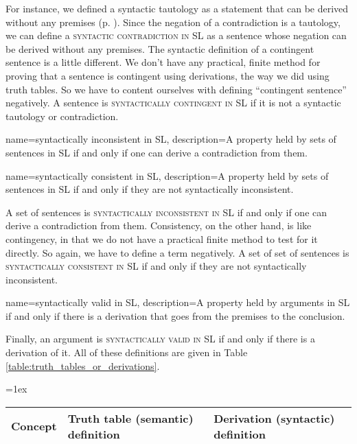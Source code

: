 {For instance, we defined a syntactic tautology as a statement that can be derived without any premises (p. \pageref{def:syntactic_tautology_in_sl}). Since the negation of a contradiction is a tautology, we can define a \textsc{\gls{syntactic contradiction in SL}} \label{def:syntactic_contradiction_in_sl} as a sentence whose negation can be derived without any premises. The syntactic definition of a contingent sentence is a little different. We don't have any practical, finite method for proving that a sentence is contingent using derivations, the way we did using truth tables. So we have to content ourselves with defining ``contingent sentence'' negatively. A sentence is \textsc{\gls{syntactically contingent in SL}} \label{def:syntactically_contingent_in_sl} if it is not a syntactic tautology or contradiction. 
 
{
name=syntactically inconsistent in SL,
description={A property held by sets of sentences in SL if and only if one can derive a contradiction from them.}
}

{
name=syntactically consistent in SL,
description={A property held by sets of sentences in SL if and only if they are not syntactically inconsistent.}
}

A set of sentences is \textsc{\gls{syntactically inconsistent in SL}} \label{def:syntactically_inconsistent_ in_sl} if and only if one can derive a contradiction from them. Consistency, on the other hand, is like contingency, in that we do not have a practical finite method to test for it directly. So again, we have to define a term negatively. A set of set of sentences is \textsc{\gls{syntactically consistent in SL}} \label{def:syntactically consistent in SL} if and only if they are not syntactically inconsistent.
    
{
name=syntactically valid in SL,
description={A property held by arguments in SL if and only if there is a derivation that goes from the premises to the conclusion.}
}

Finally, an argument is \textsc{\gls{syntactically valid in SL}} \label{def:syntactically_valid_in_SL} if and only if there is a derivation of it. All of these definitions are given in Table \ref{table:truth_tables_or_derivations}.


\begin{sidewaystable}
\begin{mdframed}[style=mytablebox]
\tabulinesep=1ex
\begin{tabu}{X[.5,c,m] ||X[1,l,m] |X[1,l,m]}
\bf{Concept} 		&	\bf{Truth table (semantic) definition} 	&	\bf{Derivation (syntactic) definition} \\ \hline \hline


\end{tabu}
\end{mdframed}
\end{sidewaystable}}
